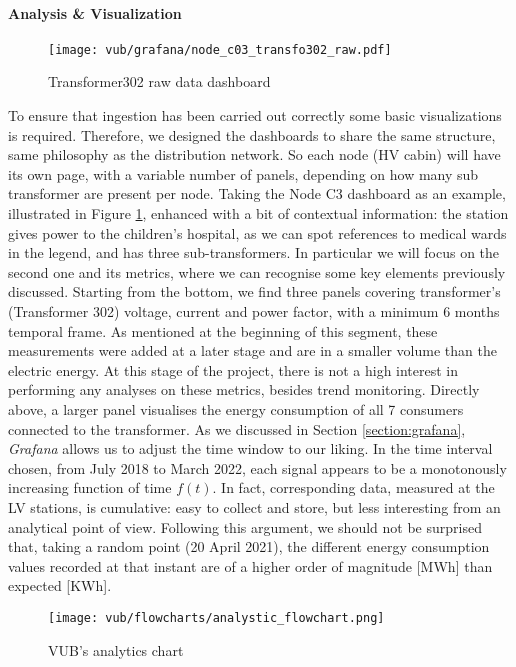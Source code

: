 \paragraph{Analysis \& Visualization}
\begin{figure}[ht]
    \texttt{[image: vub/grafana/node\_c03\_transfo302\_raw.pdf]}
    \caption{Transformer302 raw data dashboard}
    \label{fig:vub_raw_rad}
\end{figure}
To ensure that ingestion has been carried out correctly some basic visualizations is required.
Therefore, we designed the dashboards to share the same structure, same philosophy as the distribution network.
So each node (\ac{HV} cabin) will have its own page, with a variable number of panels, depending on how many sub transformer are present per node.
Taking the Node C3 dashboard as an example, illustrated in Figure \ref{fig:vub_raw_rad}, enhanced with a bit of contextual information: 
the station gives power to the children's hospital, as we can spot references to medical wards in the legend, and has three sub-transformers.
In particular we will focus on the second one and its metrics, where we can recognise some key elements previously discussed.
Starting from the bottom, we find three panels covering transformer's (Transformer 302) voltage, current and power factor, with a minimum 6 months temporal frame.
As mentioned at the beginning of this segment, these measurements were added at a later stage and are in a smaller volume than the electric energy. 
At this stage of the project, there is not a high interest in performing any analyses on these metrics, besides trend monitoring. 
Directly above, a larger panel visualises the energy consumption of all 7 consumers connected to the transformer.
As we discussed in Section \ref{section:grafana}, \textit{Grafana} allows us to adjust the time window to our liking.
In the time interval chosen, from July 2018 to March 2022, each signal appears to be a monotonously increasing function of time $f(t)$. 
In fact, corresponding data, measured at the \ac{LV} stations, is cumulative: easy to collect and store, but less interesting from an analytical point of view. 
Following this argument, we should not be surprised that, taking a random point (20 April 2021), the different energy consumption values recorded at that instant 
are of a higher order of magnitude [MWh] than expected [KWh].
\begin{figure}[ht]
    \texttt{[image: vub/flowcharts/analystic\_flowchart.png]}
    \caption{\ac{VUB}'s analytics chart}
    \label{fig:vub_anal_chart}
\end{figure}

